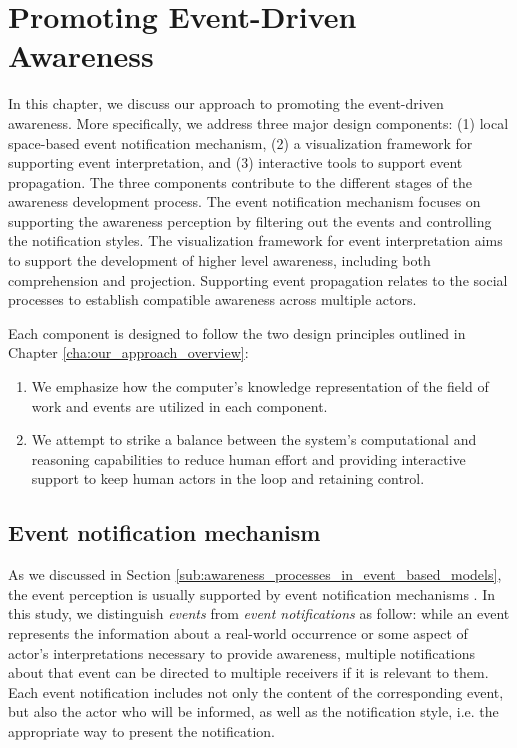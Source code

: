 \graphicspath{{Figures/}}

\chapter{Promoting Event-Driven Awareness} %
\label{cha:promoting_event_driven_awareness}
In this chapter, we discuss our approach to promoting the event-driven awareness. More specifically, we address three major design components: (1) local space-based event notification mechanism, (2) a visualization framework for supporting event interpretation, and (3) interactive tools to support event propagation. The three components contribute to the different stages of the awareness development process. The event notification mechanism focuses on supporting the awareness perception by filtering out the events and controlling the notification styles. The visualization framework for event interpretation aims to support the development of higher level awareness, including both comprehension and projection. Supporting event propagation relates to the social processes to establish compatible awareness across multiple actors.

Each component is designed to follow the two design principles outlined in Chapter \ref{cha:our_approach_overview}:
\begin{enumerate}
	\item We emphasize how the computer's knowledge representation of the field of work and events are utilized in each component.
	\item We attempt to strike a balance between the system's computational and reasoning capabilities to reduce human effort and providing interactive support to keep human actors in the loop and retaining control.
\end{enumerate}

\section{Event notification mechanism} %
\label{sec:event_notification_mechanism}
As we discussed in Section \ref{sub:awareness_processes_in_event_based_models}, the event perception is usually supported by event notification mechanisms \cite{McCrickard2003}. In this study, we distinguish \emph{events} from \emph{event notifications} as follow: while an event represents the information about a real-world occurrence or some aspect of actor's interpretations necessary to provide awareness, multiple notifications about that event can be directed to multiple receivers if it is relevant to them. Each event notification includes not only the content of the corresponding event, but also the actor who will be informed, as well as the notification style, i.e. the appropriate way to present the notification.

